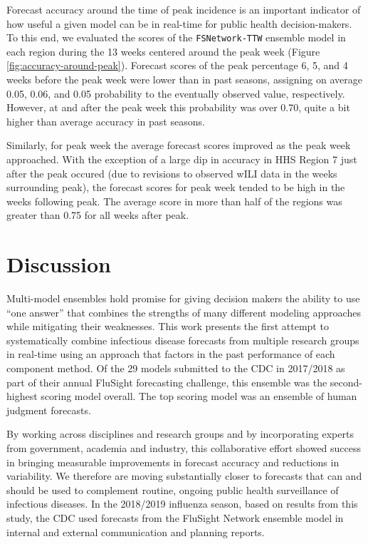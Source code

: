 \documentclass{article}\usepackage[]{graphicx}\usepackage[]{color}
\begin{document}
Forecast accuracy around the time of peak incidence is an important indicator of how useful a given model can be in real-time for public health decision-makers.
To this end, we evaluated the scores of the {\tt FSNetwork-TTW} ensemble model in each region during the 13 weeks centered around the peak week (Figure \ref{fig:accuracy-around-peak}).
Forecast scores of the peak percentage 6, 5, and 4 weeks before the peak week were lower than in past seasons, assigning on average
0.05,
0.06, and 
0.05
probability to the eventually observed value, respectively. 
However, at and after the peak week this probability was over 0.70, quite a bit higher than average accuracy in past seasons.

Similarly, for peak week the average forecast scores improved as the peak week approached. With the exception of a large dip in accuracy in HHS Region 7 just after the peak occured (due to revisions to observed wILI data in the weeks surrounding peak), the forecast scores for peak week tended to be high in the weeks following peak. The average score in more than half of the regions was greater than 0.75 for all weeks after peak. 


\section{Discussion}

Multi-model ensembles hold promise for giving decision makers the ability to use ``one answer'' that combines the strengths of many different modeling approaches while mitigating their weaknesses. 
This work presents the first attempt to systematically combine infectious disease forecasts from multiple research groups in real-time using an approach that factors in the past performance of each component method.
Of the 29 models submitted to the CDC in 2017/2018 as part of their annual FluSight forecasting challenge, this ensemble was the second-highest scoring model overall. 
The top scoring model was an ensemble of human judgment forecasts.\cite{farrow2017human}

By working across disciplines and research groups and by incorporating experts from government, academia and industry, this collaborative effort showed success in bringing measurable improvements in forecast accuracy and reductions in variability.
We therefore are moving substantially closer to forecasts that can and should be used to complement routine, ongoing public health surveillance of infectious diseases.
In the 2018/2019 influenza season, based on results from this study, the CDC used forecasts from the FluSight Network ensemble model in internal and external communication and planning reports.
\end{document}
